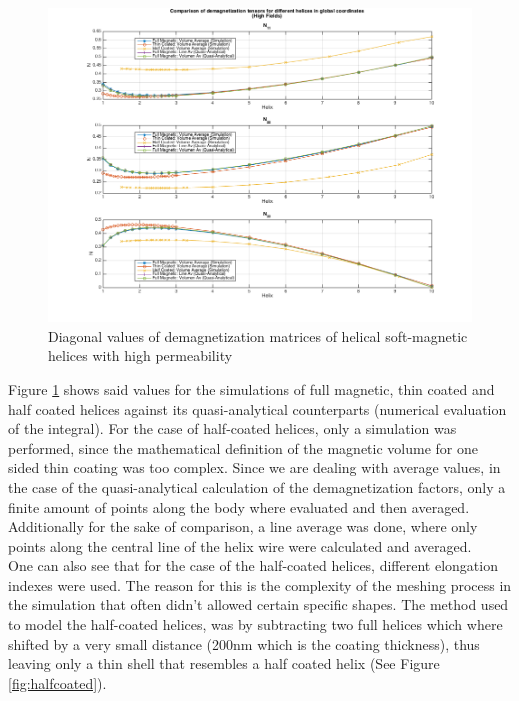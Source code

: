 \begin{figure}[ht]
	\centering
  \includegraphics[width=1\textwidth]{Pictures/DemagFactors_Comparison_High.png}
	\caption{Diagonal values of demagnetization matrices of helical soft-magnetic helices with high permeability}
	\label{fig:DemagHigh}
\end{figure}

Figure \ref{fig:DemagHigh} shows said values for the simulations of full magnetic, thin coated and half coated helices against its quasi-analytical counterparts (numerical evaluation of the integral). For the case of half-coated helices, only a simulation was performed, since the mathematical definition of the magnetic volume for one sided thin coating was too complex. Since we are dealing with average values, in the case of the quasi-analytical calculation of the demagnetization factors, only a finite amount of points along the body where evaluated and then averaged. Additionally for the sake of comparison, a line average was done, where only points along the central line of the helix wire were calculated and averaged.\\

One can also see that for the case of the half-coated helices, different elongation indexes were used. The reason for this is the complexity of the meshing process in the simulation that often didn't allowed certain specific shapes. The method used to model the half-coated helices, was by subtracting two full helices which where shifted by a very small distance (200nm which is the coating thickness), thus leaving only a thin shell that resembles a half coated helix (See Figure \ref{fig:halfcoated}). \\

